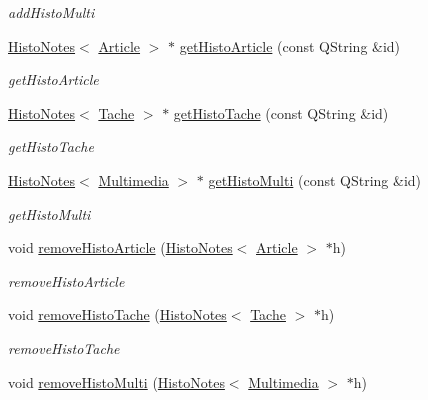 \begin{DoxyCompactItemize}
\begin{DoxyCompactList}\small\item\em add\+Histo\+Multi \end{DoxyCompactList}\item 
\hyperlink{class_histo_notes}{Histo\+Notes}$<$ \hyperlink{class_article}{Article} $>$ $\ast$ \hyperlink{class_histo_note_manager_acabff86c6849ae6c7870a52785b85f6a}{get\+Histo\+Article} (const Q\+String \&id)
\begin{DoxyCompactList}\small\item\em get\+Histo\+Article \end{DoxyCompactList}\item 
\hyperlink{class_histo_notes}{Histo\+Notes}$<$ \hyperlink{class_tache}{Tache} $>$ $\ast$ \hyperlink{class_histo_note_manager_adfa63136dbd09fa31901eb41ee18fbb2}{get\+Histo\+Tache} (const Q\+String \&id)
\begin{DoxyCompactList}\small\item\em get\+Histo\+Tache \end{DoxyCompactList}\item 
\hyperlink{class_histo_notes}{Histo\+Notes}$<$ \hyperlink{class_multimedia}{Multimedia} $>$ $\ast$ \hyperlink{class_histo_note_manager_a96479ca8f5d71d766d0edb5baec92022}{get\+Histo\+Multi} (const Q\+String \&id)
\begin{DoxyCompactList}\small\item\em get\+Histo\+Multi \end{DoxyCompactList}\item 
void \hyperlink{class_histo_note_manager_a64f3060a3e56181f5389eaab0cd1573c}{remove\+Histo\+Article} (\hyperlink{class_histo_notes}{Histo\+Notes}$<$ \hyperlink{class_article}{Article} $>$ $\ast$h)
\begin{DoxyCompactList}\small\item\em remove\+Histo\+Article \end{DoxyCompactList}\item 
void \hyperlink{class_histo_note_manager_a2533870bcbf5ac5e97ab10c0439b5ea4}{remove\+Histo\+Tache} (\hyperlink{class_histo_notes}{Histo\+Notes}$<$ \hyperlink{class_tache}{Tache} $>$ $\ast$h)
\begin{DoxyCompactList}\small\item\em remove\+Histo\+Tache \end{DoxyCompactList}\item 
void \hyperlink{class_histo_note_manager_a3132f28bcfe8eb36c3eb8000be18d994}{remove\+Histo\+Multi} (\hyperlink{class_histo_notes}{Histo\+Notes}$<$ \hyperlink{class_multimedia}{Multimedia} $>$ $\ast$h)

\end{DoxyCompactItemize}
